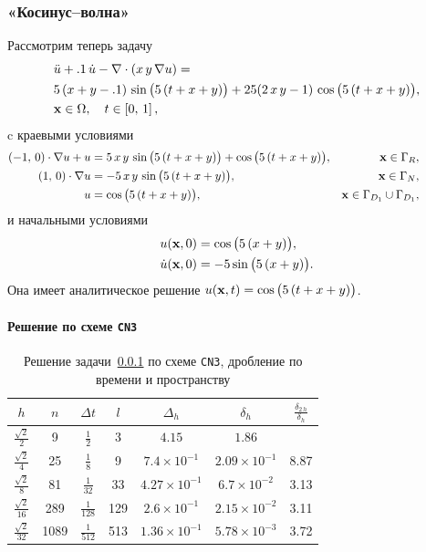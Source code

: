 \subsubsection{«Косинус--волна»}
\label{cosWave}

Рассмотрим теперь задачу
\begin{align*}
	& \ddot{u} + .1 \, \dot{u} -  \nabla \cdot (x \, y \, \nabla u) = \\
	& 5 \, (x + y - .1) \, \sin \big( 5 \, (t + x + y) \big) + 25 (2 \, x \, y - 1) \, \cos \big( 5 \, (t + x + y) \big), \\
	& \boldsymbol{\mathbf{x}} \in \Omega, \quad t \in \left[ 0, \, 1 \right],
\end{align*}
c краевыми условиями
\begin{align*}
	(-1, \, 0) \cdot \nabla u + u &= 5 \, x \, y \, \sin \big( 5 \, (t + x + y) \big) + \cos \big( 5 \, (t + x + y) \big), & \boldsymbol{\mathbf{x}} \in \Gamma_R, & \qquad \qquad \\
	(1, \, 0) \cdot \nabla u &= -5 \, x \, y \, \sin \big( 5 \, (t + x + y) \big), & \boldsymbol{\mathbf{x}} \in \Gamma_N, & \\
	u &= \cos \big( 5 \, (t + x + y) \big), & \boldsymbol{\mathbf{x}} \in \Gamma_{D_1} \cup \Gamma_{D_1}, &
\end{align*}
и начальными условиями
\begin{align*}
	u(\boldsymbol{\mathbf{x}}, 0) &= \cos \big( 5 \, (x + y) \big), \\
	\dot{u}(\boldsymbol{\mathbf{x}}, 0) &= -5 \sin \big( 5 \, (x + y) \big).
\end{align*}
Она имеет аналитическое решение $u(\boldsymbol{\mathbf{x}}, t) = \cos \big( 5 \, (t + x + y) \big)$.

\paragraph{Решение по схеме \texttt{CN3}}

\begin{table}[H]
\caption{Решение задачи~\ref{cosWave} по схеме \texttt{CN3}, дробление по времени и пространству}
\label{tab:CN3cosWaveFull}
	\begin{center}\begin{tabular}{|c|c|c|c|c|c|c|}
		\hline
		$h$ & $n$ & $\Delta t$ & $l$ & $\Delta_h$ & $\delta_h$ & $\frac{\delta_{2 \, h}}{\delta_h}$ \\
		\hline
		$\frac{\sqrt{2}}{2}$ & 9 & $\frac{1}{2}$ & 3 & $4.15$ & $1.86$ & \\
		\hline
		$\frac{\sqrt{2}}{4}$ & 25 & $\frac{1}{8}$ & 9 & $7.4 \times 10^{-1}$ & $2.09 \times 10^{-1}$ & 8.87 \\
		\hline
		$\frac{\sqrt{2}}{8}$ & 81 & $\frac{1}{32}$ & 33 & $4.27 \times 10^{-1}$ & $6.7 \times 10^{-2}$ & 3.13 \\
		\hline
		$\frac{\sqrt{2}}{16}$ & 289 & $\frac{1}{128}$ & 129 & $2.6 \times 10^{-1}$ & $2.15 \times 10^{-2}$ & 3.11 \\
		\hline
		$\frac{\sqrt{2}}{32}$ & 1089 & $\frac{1}{512}$ & 513 & $1.36 \times 10^{-1}$ & $5.78 \times 10^{-3}$ & 3.72 \\
		\hline
	\end{tabular}\end{center}
\end{table}

